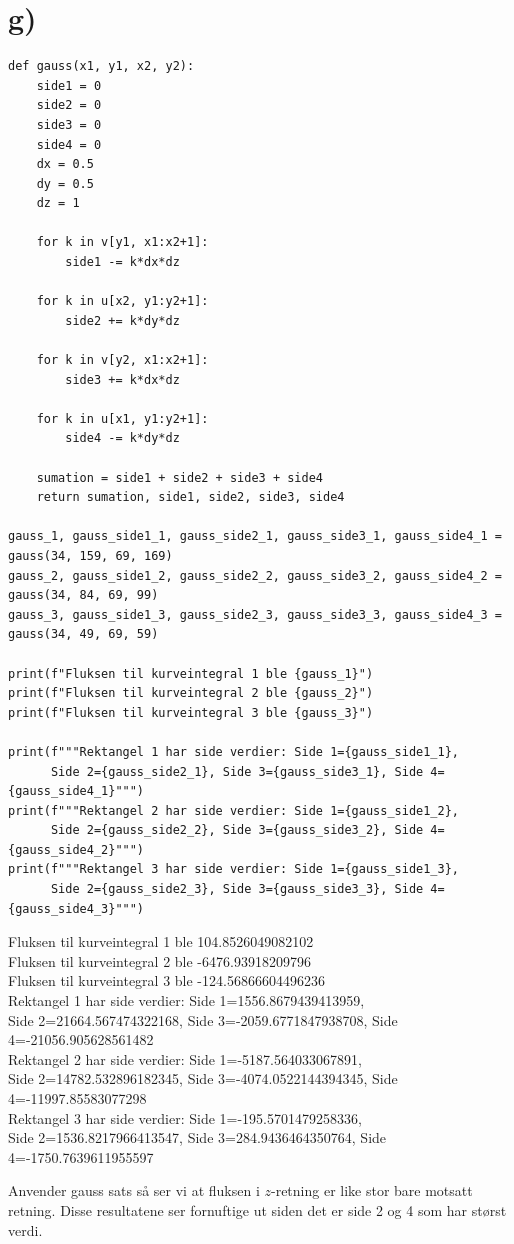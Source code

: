 \documentclass[a4paper,10pt,norsk]{article}
\begin{document}
	\section*{g)}\label{ass:g}
\begin{lstlisting}
def gauss(x1, y1, x2, y2):
    side1 = 0
    side2 = 0
    side3 = 0
    side4 = 0
    dx = 0.5
    dy = 0.5
    dz = 1

    for k in v[y1, x1:x2+1]:
        side1 -= k*dx*dz

    for k in u[x2, y1:y2+1]:
        side2 += k*dy*dz

    for k in v[y2, x1:x2+1]:
        side3 += k*dx*dz

    for k in u[x1, y1:y2+1]:
        side4 -= k*dy*dz

    sumation = side1 + side2 + side3 + side4
    return sumation, side1, side2, side3, side4

gauss_1, gauss_side1_1, gauss_side2_1, gauss_side3_1, gauss_side4_1 = gauss(34, 159, 69, 169)
gauss_2, gauss_side1_2, gauss_side2_2, gauss_side3_2, gauss_side4_2 = gauss(34, 84, 69, 99)
gauss_3, gauss_side1_3, gauss_side2_3, gauss_side3_3, gauss_side4_3 = gauss(34, 49, 69, 59)

print(f"Fluksen til kurveintegral 1 ble {gauss_1}")
print(f"Fluksen til kurveintegral 2 ble {gauss_2}")
print(f"Fluksen til kurveintegral 3 ble {gauss_3}")

print(f"""Rektangel 1 har side verdier: Side 1={gauss_side1_1},
      Side 2={gauss_side2_1}, Side 3={gauss_side3_1}, Side 4={gauss_side4_1}""")
print(f"""Rektangel 2 har side verdier: Side 1={gauss_side1_2},
      Side 2={gauss_side2_2}, Side 3={gauss_side3_2}, Side 4={gauss_side4_2}""")
print(f"""Rektangel 3 har side verdier: Side 1={gauss_side1_3},
      Side 2={gauss_side2_3}, Side 3={gauss_side3_3}, Side 4={gauss_side4_3}""")
\end{lstlisting}

\begin{tcolorbox}
Fluksen til kurveintegral 1 ble 104.8526049082102\\
Fluksen til kurveintegral 2 ble -6476.93918209796\\
Fluksen til kurveintegral 3 ble -124.56866604496236\\
Rektangel 1 har side verdier: Side 1=1556.8679439413959,\\
      Side 2=21664.567474322168, Side 3=-2059.6771847938708, Side 4=-21056.905628561482\\
Rektangel 2 har side verdier: Side 1=-5187.564033067891,\\
      Side 2=14782.532896182345, Side 3=-4074.0522144394345, Side 4=-11997.85583077298\\
Rektangel 3 har side verdier: Side 1=-195.5701479258336,\\
      Side 2=1536.8217966413547, Side 3=284.9436464350764, Side 4=-1750.7639611955597
\end{tcolorbox}
Anvender gauss sats så ser vi at fluksen i $z$-retning er like stor bare motsatt retning.
Disse resultatene ser fornuftige ut siden det er side 2 og 4 som har størst verdi.
\end{document}
